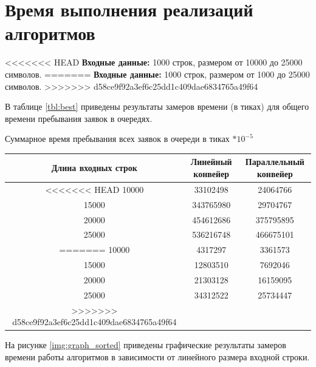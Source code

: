 \section{Время выполнения реализаций алгоритмов}

<<<<<<< HEAD
\textbf{Входные данные:} 1000 строк, размером от 10000 до 25000 символов.
=======
\textbf{Входные данные:} 1000 строк, размером от 1000 до 25000 символов.
>>>>>>> d58ce9f92a3ef6c25dd1c409dae6834765a49f64

В таблице \ref{tbl:best} приведены результаты замеров времени (в тиках) для общего времени пребывания заявок в очередях.

\begin{center}
	\begin{threeparttable}
		\caption{Суммарное время пребывания всех заявок в очереди в тиках $* 10^{-5}$}
		\label{tbl:best}
		\begin{tabular}{|c|c|c|}
			\hline
			Длина входных строк &Линейный конвейер &Параллельный конвейер\\
			\hline
<<<<<<< HEAD
			10000 & 33102498& 24064766 \\
			\hline
		    15000& 343765980 & 29704767 \\
		    \hline
		    20000& 454612686 & 375795895\\
			\hline
		    25000 & 536216748& 466675101 \\
=======
			10000 & 4317297& 3361573 \\
			\hline
		    15000&12803510 &7692046 \\
		    \hline
		    20000&21303128 & 16159095\\
			\hline
		    25000 & 34312522&25734447 \\
>>>>>>> d58ce9f92a3ef6c25dd1c409dae6834765a49f64
			\hline
		\end{tabular}
		
	\end{threeparttable}
\end{center}


 На рисунке \ref{img:graph_sorted} приведены графические результаты замеров времени работы алгоритмов в зависимости от линейного размера входной строки.

